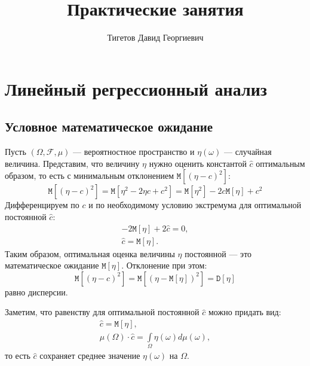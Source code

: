 \documentclass[a4paper,12pt]{article}
\newcommand{\expectation}[1]{\texttt{M} \left[ #1 \right]}
\newcommand{\variance}[1]{\texttt{D} \left[ #1 \right]}
\begin{document}
\title{Практические занятия}
\author{Тигетов Давид Георгиевич}
\maketitle

\setcounter{section}{5}

\section{Линейный регрессионный анализ}

\subsection*{Условное математическое ожидание}

Пусть $(\Omega, \mathcal{F}, \mu)$ --- вероятностное пространство и $\eta(\omega)$ --- случайная величина. Представим, что величину
$\eta$ нужно оценить константой $\widehat{c}$ оптимальным образом, то есть с минимальным отклонением $\expectation{(\eta - c)^2}$:
\[
    \expectation{(\eta - c)^2}
    = \expectation{\eta^2 - 2 \eta c + c^2}
    = \expectation{\eta^2} - 2 c \expectation{\eta} + c^2
\]
Дифференцируем по $c$ и по необходимому условию экстремума для оптимальной постоянной $\widehat{c}$:
\begin{gather*}
    - 2 \expectation{\eta} + 2 \widehat{c} = 0 , \\
    \widehat{c} = \expectation{\eta}.
\end{gather*}
Таким образом, оптимальная оценка величины $\eta$ постоянной --- это математическое ожидание $\expectation{\eta}$. Отклонение при
этом:
\[
    \expectation{(\eta - c)^2}
    = \expectation{(\eta - \expectation{\eta})^2}
    = \variance{\eta}
\]
равно дисперсии.

Заметим, что равенству для оптимальной постоянной $\widehat{c}$ можно придать вид:
\begin{gather*}
    \widehat c = \expectation{\eta}, \\
    \mu(\Omega) \cdot \widehat c = \int \limits_\Omega \eta(\omega) d \mu(\omega) ,
\end{gather*}
то есть $\widehat{c}$ сохраняет среднее значение $\eta(\omega)$ на $\Omega$.
\end{document}
